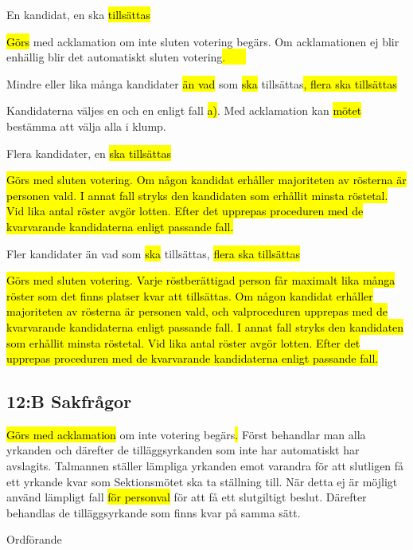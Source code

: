 \documentclass[../_main/handlingar.tex]{subfiles}
\begin{document}
\begin{attsatser}
        \begin{alphlist}
        \item En kandidat, en ska \hl{tillsättas}\par
        \hl{Görs} med acklamation om inte sluten votering begärs. Om acklamationen ej blir enhällig blir det automatiskt sluten votering\hl{. \ \ \ }

        \item Mindre eller lika många kandidater \hl{än vad} som \hl{ska} tillsättas\hl{, flera ska tillsättas}\par
        Kandidaterna väljes en och en enligt fall \hl{a)}. Med acklamation kan \hl{mötet} bestämma att välja alla i klump.

        \item Flera kandidater, en \hl{ska tillsättas}\par
        \hl{
        Görs med sluten votering.
        Om någon kandidat erhåller majoriteten av rösterna är personen vald.
        I annat fall stryks den kandidaten som erhållit minsta röstetal.
        Vid lika antal röster avgör lotten.
        Efter det upprepas proceduren med de kvarvarande kandidaterna enligt passande fall.
        }

        \item Fler kandidater än vad som \hl{ska} tillsättas, \hl{flera ska tillsättas}\par
        \hl{
        Görs med sluten votering.
        Varje röstberättigad person får maximalt lika många röster som det finns platser kvar att tillsättas.
        Om någon kandidat erhåller majoriteten av rösterna är personen vald, och valproceduren upprepas med de kvarvarande kandidaterna enligt passande fall.
        I annat fall stryks den kandidaten som erhållit minsta röstetal.
        Vid lika antal röster avgör lotten.
        Efter det upprepas proceduren med de kvarvarande kandidaterna enligt passande fall.
        }
        \end{alphlist}

        \subsection*{12:B Sakfrågor}

        \hl{Görs med acklamation} om inte votering begärs\hl{. }Först behandlar man alla yrkanden och därefter de tilläggsyrkanden som inte har automatiskt har avslagits. Talmannen ställer lämpliga yrkanden emot varandra för att slutligen få ett yrkande kvar som Sektionsmötet ska ta ställning till. När detta ej är möjligt använd lämpligt fall \hl{för personval} för att få ett slutgiltigt beslut. Därefter behandlas de tilläggsyrkande som finns kvar på samma sätt.

    \changenote

\end{attsatser}

\begin{signatures}{1}
    \ist
    \signature{\ordf}{Ordförande}
\end{signatures}
\end{document}
